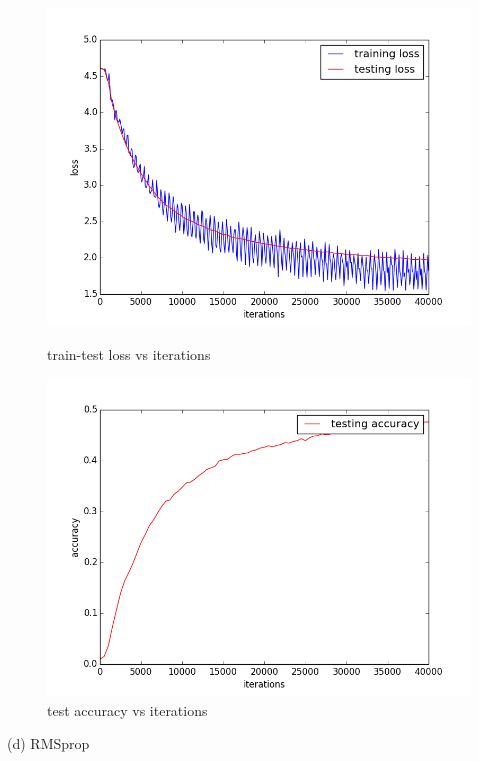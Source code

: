 \documentclass{article} %
\begin{document}
\begin{figure}[H]
    \begin{minipage}{0.5\linewidth}
        \centering
        \includegraphics[scale=0.35]{Nesterov_1.png}
        \caption{train-test loss vs iterations}
    \end{minipage}
    \begin{minipage}{0.5\linewidth}
        \centering
        \includegraphics[scale=0.35]{Nesterov_2.png}
     \caption{test accuracy vs iterations}
    \end{minipage}
\end{figure}
(d) RMSprop
\end{document}
